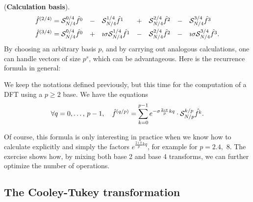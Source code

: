 \begin{rem}{(\upshape \textbf{Calculation basis}).}
\begin{align*}
\hat{f}^{(2/4)} & = \mathcal{S}_{N / 4}^{0/4} \hat{f^0} & - & \quad \mathcal{S}_{N / 4}^{1 / 4} \hat{f^1} & + & \quad \mathcal{S}_{N / 4}^{2/4} \hat{f^2} & - & \quad \mathcal{S}_{N / 4}^{3 / 4} \hat{f^3} \\
\hat{f}^{(3/4)} & = \mathcal{S}_{N / 4}^{0/4} \hat{f^0} & + & \quad \imath \sigma \mathcal{S}_{N / 4 }^{1/4} \hat{f^1} & - & \quad \mathcal{S}_{N / 4}^{2/4} \hat{f^2} & - & \quad \imath \sigma \mathcal{S}_{N / 4}^{3/4} \hat{f^3}.
\end{align*}
By choosing an arbitrary basis $ p $, and by carrying out analogous calculations, one can handle vectors of size $ p^s $, which can be advantageous. Here is the recurrence formula in general:
\end{rem}
 
 
\begin{prop}
We keep the notations defined previously, but this time for the computation of a DFT using a $ p \geq 2 $ base. We have the equations
\begin{equation*}
\forall q = 0, \ldots, \, p-1, \quad \hat{f}^{(q / p)} = \sum_{k = 0}^{p-1}{e^{- \sigma \frac{2 \imath \pi}{p} kq} \cdot \mathcal{S}_{N / p}^{k / p} \hat{f^k}}.
\end{equation*}
\end{prop}
 
 
\begin{rem}
Of course, this formula is only interesting in practice when we know how to calculate explicitly and simply the factors $ e^{\frac{2 \imath \pi}{p} kq} $, for example for $ p = 2.4 , $ 8. The exercise  shows how, by mixing both base 2 and base 4 transforms, we can further optimize the number of operations.
\end{rem}
 
\subsection{The Cooley-Tukey transformation}
\label{sect2-transfo-cooley-tukey} 
 
